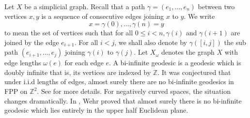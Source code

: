 \documentclass[12 pt]{amsart}
\theoremstyle{definition}
\theoremstyle{remark}
\begin{document}


Let $X$ be a simplicial graph. Recall that a path $\gamma=\left(e_{1}, \ldots, e_{n}\right)$ between two vertices $x, y$ is a sequence of consecutive edges joining $x$ to $y$. We write
\[x=\gamma(0), \ldots, \gamma(n)=y\]
to mean the set of vertices such that for all $0 \leq i<n, \gamma(i)$ and $\gamma(i+1)$ are joined by the edge $e_{i+1}$. For all $i<j$, we shall also denote by $\gamma([i, j])$ the sub path $\left(e_{i+1}, \ldots, e_{j}\right)$ joining $\gamma(i)$ to $\gamma(j)$. Let $X_\omega$ denotes the graph $X$ with edge lengths $\omega(e)$ for each edge $e$.\newline
A bi-infinite geodesic is a geodesic which is doubly infinite that is, its vertices are indexed by $\mathbb{Z}$. It was conjectured that under i.i.d lengths of edges, almost surely there are no bi-infinite geodesics in FPP on $\mathbb{Z}^2.$ See \cite{Kesten} for more details. For negatively curved spaces, the situation changes dramatically. In \cite{WW}, Wehr proved that almost surely there is no bi-infinite geodesic which lies entirely in the upper half Euclidean plane. 
\end{document}
